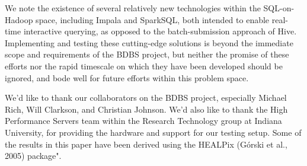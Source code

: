 \documentclass[11pt,twoside]{article}
\begin{document}
We note the existence of several relatively new technologies within the SQL-on-Hadoop space, including Impala and SparkSQL, both intended to enable real-time interactive querying, as opposed to the batch-submission approach of Hive.  Implementing and testing these cutting-edge solutions is beyond the immediate scope and requirements of the BDBS project, but neither the promise of these efforts nor the rapid timescale on which they have been developed should be ignored, and bode well for future efforts within this problem space.  

\acknowledgements We'd like to thank our collaborators on the BDBS project, especially Michael Rich, Will Clarkson, and Christian Johnson.  We'd also like to thank the High Performance Servers team within the Research Technology group at Indiana University, for providing the hardware and support for our testing setup. Some of the results in this paper have been derived using the HEALPix (Górski et al., 2005) package".


\begin{thebibliography}
\end{thebibliography}
\end{document}
